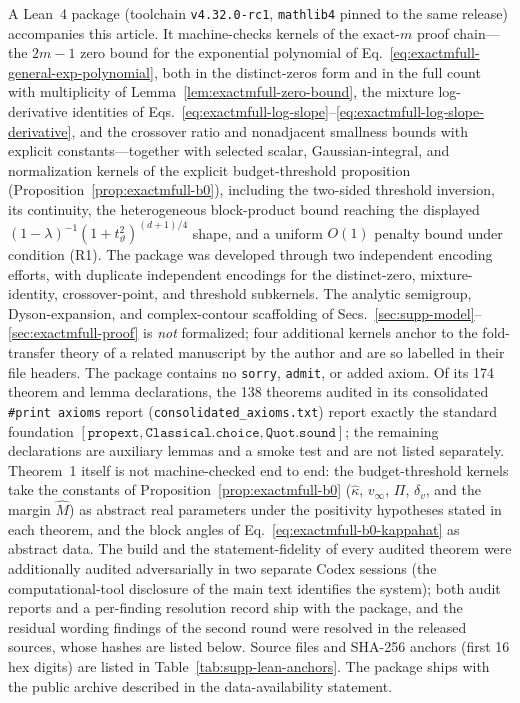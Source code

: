 \documentclass[aps,physrev,onecolumn,amsmath,amssymb,longbibliography]{revtex4-2}
\begin{document}
A Lean~4 package (toolchain \texttt{v4.32.0-rc1}, \texttt{mathlib4} pinned to
the same release) accompanies this article. It machine-checks kernels of the
exact-\(m\) proof chain---the \(2m-1\) zero bound for the exponential
polynomial of Eq.~\eqref{eq:exactmfull-general-exp-polynomial}, both in the
distinct-zeros form and in the full count with multiplicity of
Lemma~\ref{lem:exactmfull-zero-bound}, the mixture log-derivative identities of
Eqs.~\eqref{eq:exactmfull-log-slope}--\eqref{eq:exactmfull-log-slope-derivative}, and the crossover ratio and nonadjacent
smallness bounds with explicit constants---together with selected scalar,
Gaussian-integral, and normalization kernels of the explicit
budget-threshold proposition (Proposition~\ref{prop:exactmfull-b0}), including the two-sided threshold
inversion, its continuity, the heterogeneous block-product bound reaching
the displayed \((1-\lambda)^{-1}(1+t_\vartheta^2)^{(d+1)/4}\) shape, and a
uniform \(O(1)\) penalty bound under condition (R1). The package was
developed through two independent encoding efforts, with duplicate
independent encodings for the distinct-zero, mixture-identity,
crossover-point, and threshold subkernels. The analytic semigroup,
Dyson-expansion, and complex-contour scaffolding of
Secs.~\ref{sec:supp-model}--\ref{sec:exactmfull-proof} is
\emph{not} formalized; four additional kernels anchor to the fold-transfer
theory of a related manuscript by the author \cite{zhouyi2026jcp}
and are so labelled in their file headers. The package contains no \texttt{sorry},
\texttt{admit}, or added axiom.  Of its 174 theorem and lemma declarations,
the 138 theorems audited in its consolidated \texttt{\#print axioms}
report (\texttt{consolidated\_axioms.txt}) report
exactly the standard foundation \([\texttt{propext},
\texttt{Classical.choice}, \texttt{Quot.sound}]\); the remaining
declarations are auxiliary lemmas and a smoke test and are not listed
separately.  Theorem~1 itself is not machine-checked end to end: the
budget-threshold kernels take the constants of
Proposition~\ref{prop:exactmfull-b0} (\(\hat\kappa\), \(v_\infty\), \(\Pi\),
\(\delta_v\), and the margin \(\hat M\)) as abstract real parameters under
the positivity hypotheses stated in each theorem, and the block angles of
Eq.~\eqref{eq:exactmfull-b0-kappahat} as abstract data.  The build and the
statement-fidelity of every audited theorem were additionally audited
adversarially in two separate Codex sessions (the computational-tool
disclosure of the main text identifies the system); both audit reports and
a per-finding resolution record ship with the package, and the residual
wording findings of the second round were resolved in the released sources,
whose hashes are listed below.  Source files and SHA-256 anchors (first 16
hex digits) are listed in Table~\ref{tab:supp-lean-anchors}.  The package
ships with the public archive described in the data-availability statement.
\end{document}
